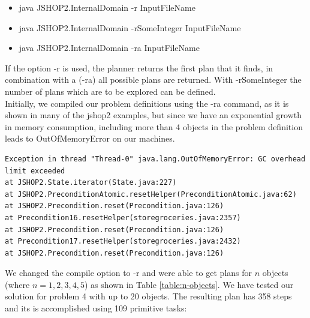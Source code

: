 \documentclass[paper=a4, fontsize=11pt]{scrartcl}
\begin{document}
 \begin{itemize}
 	\item java JSHOP2.InternalDomain -r InputFileName
 	\item java JSHOP2.InternalDomain -rSomeInteger InputFileName
 	\item java JSHOP2.InternalDomain -ra InputFileName
 \end{itemize}

 If the option -r is used, the planner returns the first plan that it finds, in combination with a (-ra) all possible plans are returned. With -rSomeInteger the number of plans which are to be explored can be defined. \\

 Initially, we compiled our problem definitions using the -ra command, as it is shown in many of the jshop2 examples, but since we have an exponential growth in memory consumption, including more than 4 objects in the problem definition leads to OutOfMemoryError on our machines. \\


\begin{lstlisting}
Exception in thread "Thread-0" java.lang.OutOfMemoryError: GC overhead limit exceeded
at JSHOP2.State.iterator(State.java:227)
at JSHOP2.PreconditionAtomic.resetHelper(PreconditionAtomic.java:62)
at JSHOP2.Precondition.reset(Precondition.java:126)
at Precondition16.resetHelper(storegroceries.java:2357)
at JSHOP2.Precondition.reset(Precondition.java:126)
at Precondition17.resetHelper(storegroceries.java:2432)
at JSHOP2.Precondition.reset(Precondition.java:126)

\end{lstlisting}

\vspace{5mm}

We changed the compile option to -r and were able to get plans for $n$ objects (where $n= 1, 2, 3, 4, 5$) as shown in Table \ref{table:n-objects}. We have tested our solution for problem 4 with up to 20 objects. The resulting plan has 358 steps and its is accomplished using 109 primitive tasks: \\
\end{document}
